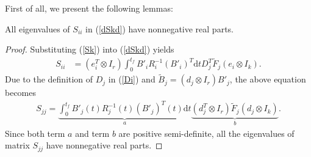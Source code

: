 \documentclass[10pt,doublecolumn]{IEEEtran}  %
\begin{document}
\appendix

First of all, we present the following lemmas:
\begin{Lem}\label{LemmaEigen}
All eigenvalues of $S_{ii}$ in (\ref{dSkd}) have nonnegative real parts.
\end{Lem}
\begin{proof}
Substituting (\ref{Sk}) into (\ref{dSkd}) yields
\begin{align*}
S_{ii}
&=(e_i^T\otimes I_r) \int^{t_f}_0
B'_iR_i^{-1}(B'_i)^T \mbox{d}t
D_j^T\tilde{F}_j(e_i\otimes I_k).
\end{align*}
Due to the definition of $D_j$ in (\ref{Di}) and $\tilde{B}_j=(d_j\otimes
I_r)B'_j$, the above equation becomes
\begin{align*}
S_{jj}=\underbrace{\int^{t_f}_0 B'_j(t)R_j^{-1}(t)(B'_j)^T(t)\mbox{d}t}_a
\underbrace{ (d_j^T\otimes I_r)\tilde{F}_j(d_j\otimes I_k)}_b.
\end{align*}
Since both term $a$ and term $b$ are positive semi-definite, all the
eigenvalues of matrix $S_{jj}$ have nonnegative real parts.
\end{proof}
\end{document}
